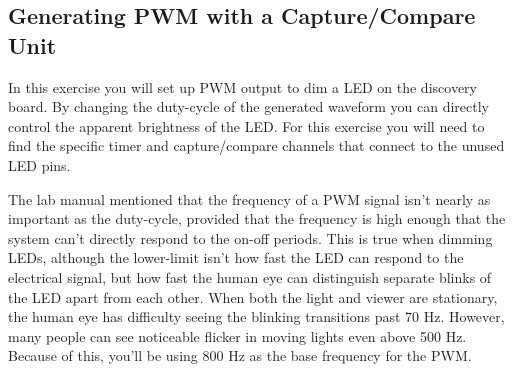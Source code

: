 \documentclass[11pt,fleqn]{book} %
\begin{document}
\subsection{Generating PWM with a Capture/Compare Unit}
In this exercise you will set up PWM output to dim a LED on the discovery board. By changing the duty-cycle of the generated waveform you can directly control the apparent brightness of the LED. For this exercise you will need to find the specific timer and capture/compare channels that connect to the unused LED pins. 

The lab manual mentioned that the frequency of a PWM signal isn't nearly as important as the duty-cycle, provided that the frequency is high enough that the system can't directly respond to the on-off periods. This is true when dimming LEDs, although the lower-limit isn't how fast the LED can respond to the electrical signal, but how fast the human eye can distinguish separate blinks of the LED apart from each other.
When both the light and viewer are stationary, the human eye has difficulty seeing the blinking transitions past 70 Hz. However, many people can see noticeable flicker in moving lights even above 500 Hz. Because of this, you'll be using 800 Hz as the base frequency for the PWM. 
\end{document}
